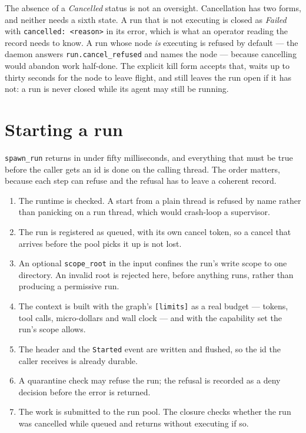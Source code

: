 The absence of a \emph{Cancelled} status is not an oversight. Cancellation has two forms, and
neither needs a sixth state. A run that is not executing is closed as \emph{Failed} with
\texttt{cancelled: <reason>} in its error, which is what an operator reading the record needs to
know. A run whose node \emph{is} executing is refused by default --- the daemon answers
\texttt{run.cancel\_refused} and names the node --- because cancelling would abandon work
half-done. The explicit kill form accepts that, waits up to thirty seconds for the node to leave
flight, and still leaves the run open if it has not: a run is never closed while its agent may
still be running.

\section{Starting a run}

\texttt{spawn\_run} returns in under fifty milliseconds, and everything that must be true before
the caller gets an id is done on the calling thread. The order matters, because each step can refuse
and the refusal has to leave a coherent record.

\begin{enumerate}
	\item The runtime is checked. A start from a plain thread is refused by name rather than
	panicking on a run thread, which would crash-loop a supervisor.
	\item The run is registered as queued, with its own cancel token, so a cancel that arrives
	before the pool picks it up is not lost.
	\item An optional \texttt{scope\_root} in the input confines the run's write scope to one
	directory. An invalid root is rejected here, before anything runs, rather than producing a
	permissive run.
	\item The context is built with the graph's \texttt{[limits]} as a real budget --- tokens, tool
	calls, micro-dollars and wall clock --- and with the capability set the run's scope allows.
	\item The header and the \texttt{Started} event are written and flushed, so the id the caller
	receives is already durable.
	\item A quarantine check may refuse the run; the refusal is recorded as a deny decision before
	the error is returned.
	\item The work is submitted to the run pool. The closure checks whether the run was cancelled
	while queued and returns without executing if so.
\end{enumerate}

